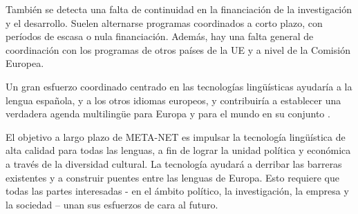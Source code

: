 \begin{multicols}{2}
También se detecta una falta de continuidad en la financiación de la investigación y el desarrollo. Suelen alternarse programas coordinados a corto plazo, con períodos de escasa o nula financiación. Además, hay una falta general de coordinación con los programas de otros países de la UE y a nivel de la Comisión Europea.

Un gran esfuerzo coordinado centrado en las tecnologías lingüísticas ayudaría a la lengua española, y a los otros idiomas europeos, y contribuiría a establecer una verdadera agenda multilingüe para Europa y para el mundo en su conjunto \cite{HuLaTec}. 

El objetivo a largo plazo de META-NET es impulsar la tecnología lingüística de alta calidad para todas las lenguas, a fin de lograr la unidad política y económica a través de la diversidad cultural. La tecnología ayudará a derribar las barreras existentes y a construir puentes entre las lenguas de Europa. Esto requiere que todas las partes interesadas - en el ámbito político, la investigación, la empresa y la sociedad -- unan sus esfuerzos de cara al futuro. 
\end{multicols}

\clearpage

